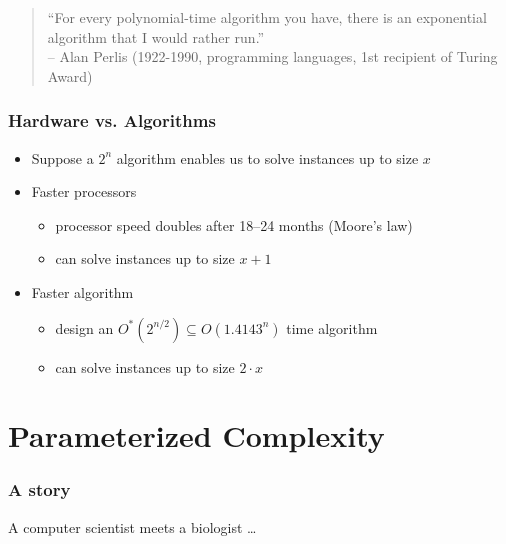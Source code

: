 \begin{frame}

	\begin{quote}
		``For every polynomial-time algorithm you have, there is an exponential algorithm that I would rather run.''\\
		\flushright -- Alan Perlis (1922-1990, programming languages, 1st recipient of Turing Award)
	\end{quote}

\end{frame}


\begin{frame}
	\frametitle{Hardware vs. Algorithms}

	\begin{itemize}
		\item Suppose a $2^n$ algorithm enables us to solve instances up to size $x$
		\item Faster processors
		      \begin{itemize}
			      \item processor speed doubles after 18--24 months (Moore's law)
			      \item can solve instances up to size $x+1$
		      \end{itemize}
		\item Faster algorithm
		      \begin{itemize}
			      \item design an $O^*(2^{n/2}) \subseteq O(1.4143^{n})$ time algorithm
			      \item can solve instances up to size $2 \cdot x$
		      \end{itemize}
	\end{itemize}

\end{frame}


\section{Parameterized Complexity}


\begin{frame}
	\frametitle{A story}

	\noindent
	A computer scientist meets a biologist \ldots
	\slides{\vspace{6.5cm}}

\end{frame}

